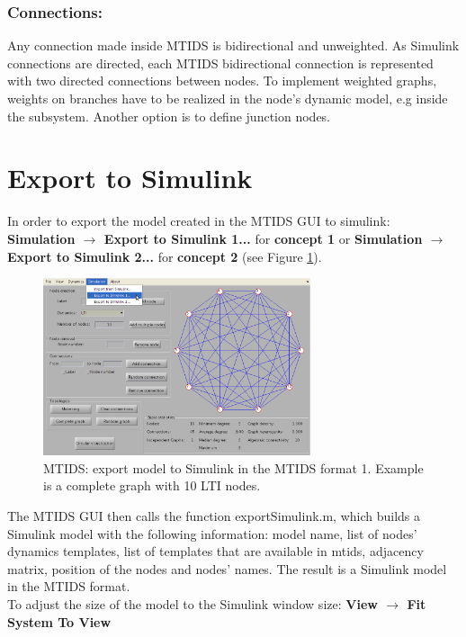 \documentclass[a4paper,twoside, openright,12pt]{report}
\begin{document}
\subsubsection{Connections:}
Any connection made inside MTIDS is bidirectional and unweighted. As Simulink connections are directed, each MTIDS bidirectional connection
 is represented with two directed connections between nodes. To implement weighted graphs, weights 
on branches have to be realized in the node's dynamic model, e.g inside the subsystem. Another option is to define junction nodes.

\section{Export to Simulink}\label{exportToSimulink}
In order to export the model created in the MTIDS GUI to simulink: \textbf{Simulation $\rightarrow$ Export to Simulink 1...} for  \textbf{concept 1} 
or \textbf{Simulation $\rightarrow$ Export to Simulink 2...} for \textbf{ concept 2} (see Figure \ref{exportFig}).
\\
\begin{figure}[htb]
\centering
\includegraphics[width=0.7\textwidth]{pics/screenExport2.eps}
\caption[MTIDS export to Simulink]{MTIDS: export model to Simulink in the MTIDS format 1. Example is a complete graph with 10 LTI nodes.  }
\label{exportFig}
\end{figure}

The MTIDS GUI then calls the function exportSimulink.m, which builds a Simulink model with the following information:
model name, list of nodes' dynamics templates, list of templates that are available in mtids, adjacency matrix, position of the nodes and nodes' names. 
The result is a Simulink model in the MTIDS format. \\

To adjust the size of the model to the Simulink window size: \textbf{View $\rightarrow$ Fit System To View}\\
% 
\end{document}
